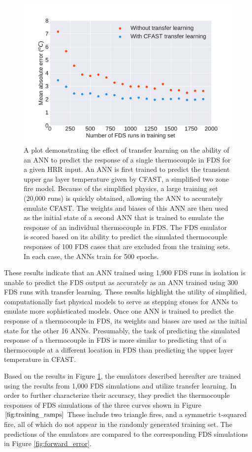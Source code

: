 \documentclass{article}
\begin{document}
\begin{figure}[htb] \centering
\includegraphics[width=.75\textwidth]{./figures/transfer_learning_effect.pdf}
\caption{A plot demonstrating the effect of transfer learning on the ability of an ANN to predict the response of a single thermocouple in FDS for a given HRR input. An ANN is first trained to predict the transient upper gas layer temperature given by CFAST, a simplified two zone fire model. Because of the simplified physics, a large training set (20,000 runs) is quickly obtained, allowing the ANN to accurately emulate CFAST. The weights and biases of this ANN are then used as the initial state of a second ANN that is trained to emulate the response of an individual thermocouple in FDS. The FDS emulator is scored based on its ability to predict the simulated thermocouple responses of 100 FDS cases that are excluded from the training sets. In each case, the ANNs train for 500 epochs.}
\label{fig:transfer_learning}
\end{figure}

These results indicate that an ANN trained using 1,900 FDS runs in isolation is unable to predict the FDS output as accurately as an ANN trained using 300 FDS runs with transfer learning. These results highlight the utility of simplified, computationally fast physical models to serve as stepping stones for ANNs to emulate more sophisticated models. Once one ANN is trained to predict the response of a thermocouple in FDS, its weights and biases are used as the initial state for the other 16 ANNs. Presumably, the task of predicting the simulated response of a thermocouple in FDS is more similar to predicting that of a thermocouple at a different location in FDS than predicting the upper layer temperature in CFAST.  

Based on the results in Figure \ref{fig:transfer_learning}, the emulators described hereafter are trained using the results from 1,000 FDS simulations and utilize transfer learning. In order to further characterize their accuracy, they predict the thermocouple responses of FDS simulations of the three curves shown in Figure $\ref{fig:training_ramps}$ These include two triangle fires, and a symmetric t-squared fire, all of which do not appear in the randomly generated training set. The predictions of the emulators are compared to the corresponding FDS simulations in Figure \ref{fig:forward_error}.
\end{document}
